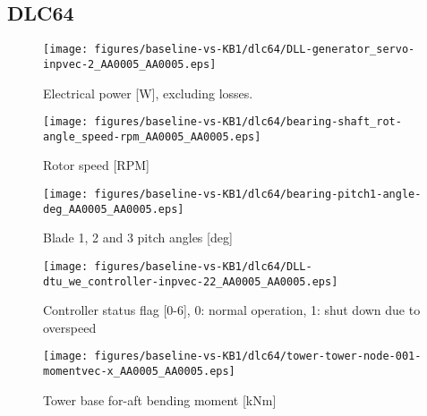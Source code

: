 
\subsection{DLC64}
\label{sec:baseline-vs-KB1:dlc64}

\begin{figure}[!ht]
\begin{center}
	\texttt{[image: figures/baseline-vs-KB1/dlc64/DLL-generator\_servo-inpvec-2\_AA0005\_AA0005.eps]}
\end{center}
\caption{Electrical power [W], excluding losses.}
\label{fig:baseline-vs-KB1:dlc64:power}
\end{figure}

\begin{figure}[!ht]
\begin{center}
	\texttt{[image: figures/baseline-vs-KB1/dlc64/bearing-shaft\_rot-angle\_speed-rpm\_AA0005\_AA0005.eps]}
\end{center}
\caption{Rotor speed [RPM]}
\label{fig:baseline-vs-KB1:dlc64:rpm}
\end{figure}

\begin{figure}[!ht]
\begin{center}
	\texttt{[image: figures/baseline-vs-KB1/dlc64/bearing-pitch1-angle-deg\_AA0005\_AA0005.eps]}
\end{center}
\caption{Blade 1, 2 and 3 pitch angles [deg]}
\label{fig:baseline-vs-KB1:dlc64:pitch}
\end{figure}

\begin{figure}[!ht]
\begin{center}
	\texttt{[image: figures/baseline-vs-KB1/dlc64/DLL-dtu\_we\_controller-inpvec-22\_AA0005\_AA0005.eps]}
\end{center}
\caption{Controller status flag [0-6], 0: normal operation, 1: shut down due to overspeed}
\label{fig:baseline-vs-KB1:dlc64:status}
\end{figure}

\begin{figure}[!ht]
\begin{center}
	\texttt{[image: figures/baseline-vs-KB1/dlc64/tower-tower-node-001-momentvec-x\_AA0005\_AA0005.eps]}
\end{center}
\caption{Tower base for-aft bending moment [kNm]}
\label{fig:baseline-vs-KB1:dlc64:tower-base-fa}
\end{figure}

